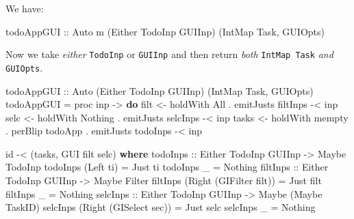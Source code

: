 \documentclass[]{article}
\newenvironment{Shaded}{}{}
\newcommand{\DataTypeTok}[1]{\textcolor[rgb]{0.56,0.13,0.00}{#1}}
\newcommand{\FunctionTok}[1]{\textcolor[rgb]{0.02,0.16,0.49}{#1}}
\newcommand{\KeywordTok}[1]{\textcolor[rgb]{0.00,0.44,0.13}{\textbf{#1}}}
\newcommand{\NormalTok}[1]{#1}
\newcommand{\OperatorTok}[1]{\textcolor[rgb]{0.40,0.40,0.40}{#1}}
\newcommand{\OtherTok}[1]{\textcolor[rgb]{0.00,0.44,0.13}{#1}}
\begin{document}
We have:

\begin{Shaded}
\begin{Highlighting}[]
\OtherTok{todoAppGUI ::} \DataTypeTok{Auto}\NormalTok{ m (}\DataTypeTok{Either} \DataTypeTok{TodoInp} \DataTypeTok{GUIInp}\NormalTok{) (}\DataTypeTok{IntMap} \DataTypeTok{Task}\NormalTok{, }\DataTypeTok{GUIOpts}\NormalTok{)}
\end{Highlighting}
\end{Shaded}

Now we take \emph{either} \texttt{TodoInp} or \texttt{GUIInp} and then return
\emph{both} \texttt{IntMap\ Task} \emph{and} \texttt{GUIOpts}.

\begin{Shaded}
\begin{Highlighting}[]
\OtherTok{todoAppGUI ::} \DataTypeTok{Auto\textquotesingle{}}\NormalTok{ (}\DataTypeTok{Either} \DataTypeTok{TodoInp} \DataTypeTok{GUIInp}\NormalTok{) (}\DataTypeTok{IntMap} \DataTypeTok{Task}\NormalTok{, }\DataTypeTok{GUIOpts}\NormalTok{)}
\NormalTok{todoAppGUI }\OtherTok{=}\NormalTok{ proc inp }\OtherTok{{-}\textgreater{}} \KeywordTok{do}
\NormalTok{    filt  }\OtherTok{\textless{}{-}}\NormalTok{ holdWith }\DataTypeTok{All}                      \OperatorTok{.}\NormalTok{ emitJusts filtInps }\OperatorTok{{-}\textless{}}\NormalTok{ inp}
\NormalTok{    selc  }\OtherTok{\textless{}{-}}\NormalTok{ holdWith }\DataTypeTok{Nothing}                  \OperatorTok{.}\NormalTok{ emitJusts selcInps }\OperatorTok{{-}\textless{}}\NormalTok{ inp}
\NormalTok{    tasks }\OtherTok{\textless{}{-}}\NormalTok{ holdWith }\FunctionTok{mempty} \OperatorTok{.}\NormalTok{ perBlip todoApp }\OperatorTok{.}\NormalTok{ emitJusts todoInps }\OperatorTok{{-}\textless{}}\NormalTok{ inp}

    \FunctionTok{id} \OperatorTok{{-}\textless{}}\NormalTok{ (tasks, }\DataTypeTok{GUI}\NormalTok{ filt selc)}
  \KeywordTok{where}
\OtherTok{    todoInps ::} \DataTypeTok{Either} \DataTypeTok{TodoInp} \DataTypeTok{GUIInp} \OtherTok{{-}\textgreater{}} \DataTypeTok{Maybe} \DataTypeTok{TodoInp}
\NormalTok{    todoInps (}\DataTypeTok{Left}\NormalTok{ ti) }\OtherTok{=} \DataTypeTok{Just}\NormalTok{ ti}
\NormalTok{    todoInps \_         }\OtherTok{=} \DataTypeTok{Nothing}
\OtherTok{    filtInps ::} \DataTypeTok{Either} \DataTypeTok{TodoInp} \DataTypeTok{GUIInp} \OtherTok{{-}\textgreater{}} \DataTypeTok{Maybe} \DataTypeTok{Filter}
\NormalTok{    filtInps (}\DataTypeTok{Right}\NormalTok{ (}\DataTypeTok{GIFilter}\NormalTok{ filt)) }\OtherTok{=} \DataTypeTok{Just}\NormalTok{ filt}
\NormalTok{    filtInps \_                       }\OtherTok{=} \DataTypeTok{Nothing}
\OtherTok{    selcInps ::} \DataTypeTok{Either} \DataTypeTok{TodoInp} \DataTypeTok{GUIInp} \OtherTok{{-}\textgreater{}} \DataTypeTok{Maybe}\NormalTok{ (}\DataTypeTok{Maybe} \DataTypeTok{TaskID}\NormalTok{)}
\NormalTok{    selcInps (}\DataTypeTok{Right}\NormalTok{ (}\DataTypeTok{GISelect}\NormalTok{ sec))  }\OtherTok{=} \DataTypeTok{Just}\NormalTok{ selc}
\NormalTok{    selcInps \_                       }\OtherTok{=} \DataTypeTok{Nothing}
\end{Highlighting}
\end{Shaded}
\end{document}
